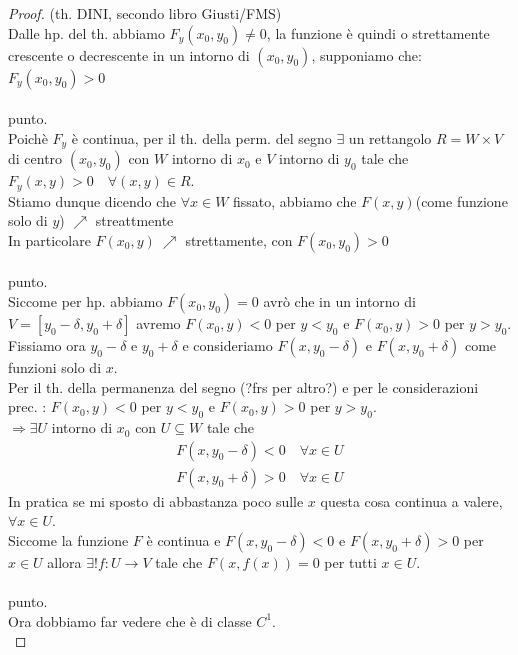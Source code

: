 \documentclass[a4paper, oneside]{article}
\begin{document}
\begin{proof}
    (th. DINI, secondo libro Giusti/FMS)\\
    Dalle hp. del th. abbiamo $F_y(x_0,y_0) \neq 0$, la funzione è quindi o strettamente crescente o decrescente in un intorno di $(x_0,y_0)$, supponiamo che: $ F_y(x_0,y_0) > 0$\\
    \hfill\\ punto.\\
    Poichè $F_y$ è continua, per il th. della perm. del segno $\exists$ un rettangolo $R = W \times V$ di centro $(x_0, y_0)$ con $W$ intorno di $x_0$ e $V$ intorno di $y_0$ tale che $F_y(x,y) > 0 \quad \forall (x,y) \in R$.\\
    Stiamo dunque dicendo che $\forall x \in W $ fissato, abbiamo che $F(x,y)$(come funzione solo di $y$) $\nearrow$ streattmente\\
    In particolare $F(x_0,y) \ \nearrow $ strettamente, con $F(x_0,y_0) > 0$\\
    \hfill\\ punto.\\
    Siccome per hp. abbiamo $F(x_0, y_0) = 0$ avrò che in un intorno di $V = [y_0-\delta, y_0+\delta]$ avremo $F(x_0,y) < 0$ per $y < y_0$ e $F(x_0,y) > 0$ per $y > y_0$.\\
    Fissiamo ora $y_0-\delta$ e $y_0+\delta$ e consideriamo $F(x,y_0-\delta)$ e $F(x,y_0+\delta)$ come funzioni solo di $x$.\\
    Per il th. della permanenza del segno (?frs per altro?) e per le considerazioni prec. : $F(x_0,y) < 0$ per $y < y_0$ e $F(x_0,y) > 0$ per $y > y_0$.\\
    $\Rightarrow \exists U$ intorno di $x_0$ con $U \subseteq W$ tale che \\
    \begin{gather*}
        F(x,y_0-\delta) < 0 \quad \forall x \in U \\
        F(x,y_0+\delta) > 0 \quad \forall x \in U
    \end{gather*}
    In pratica se mi sposto di abbastanza poco sulle $x$ questa cosa continua a valere, $\forall x \in U$.\\
    Siccome la funzione $F$ è continua e $F(x,y_0-\delta) < 0$ e $F(x,y_0+\delta) > 0$ per $x \in U$ allora $\exists! f:U \to V$ tale che $F(x,f(x)) = 0$ per tutti $x \in U$.\\
    \hfill\\ punto.\\
    Ora dobbiamo far vedere che è di classe $C^1$.\\

\end{proof}
\end{document}
